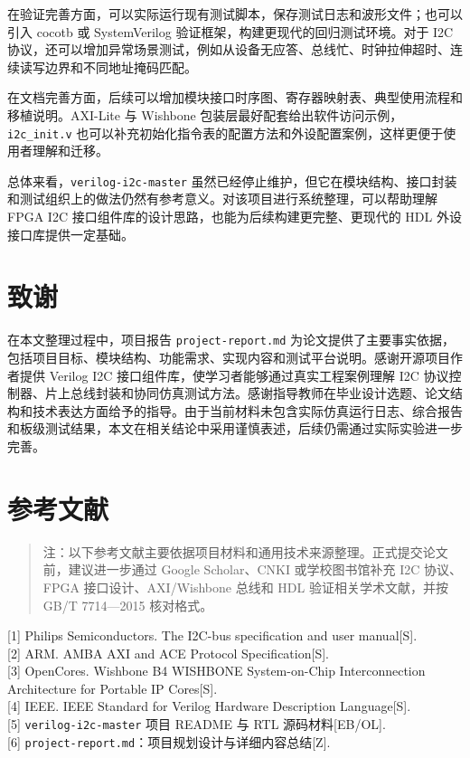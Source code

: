 在验证完善方面，可以实际运行现有测试脚本，保存测试日志和波形文件；也可以引入 cocotb 或 SystemVerilog 验证框架，构建更现代的回归测试环境。对于 I2C 协议，还可以增加异常场景测试，例如从设备无应答、总线忙、时钟拉伸超时、连续读写边界和不同地址掩码匹配。

在文档完善方面，后续可以增加模块接口时序图、寄存器映射表、典型使用流程和移植说明。AXI-Lite 与 Wishbone 包装层最好配套给出软件访问示例，\texttt{i2c\_init.v} 也可以补充初始化指令表的配置方法和外设配置案例，这样更便于使用者理解和迁移。

总体来看，\texttt{verilog-i2c-master} 虽然已经停止维护，但它在模块结构、接口封装和测试组织上的做法仍然有参考意义。对该项目进行系统整理，可以帮助理解 FPGA I2C 接口组件库的设计思路，也能为后续构建更完整、更现代的 HDL 外设接口库提供一定基础。

\section{致谢}\label{ux81f4ux8c22}

在本文整理过程中，项目报告 \texttt{project-report.md} 为论文提供了主要事实依据，包括项目目标、模块结构、功能需求、实现内容和测试平台说明。感谢开源项目作者提供 Verilog I2C 接口组件库，使学习者能够通过真实工程案例理解 I2C 协议控制器、片上总线封装和协同仿真测试方法。感谢指导教师在毕业设计选题、论文结构和技术表达方面给予的指导。由于当前材料未包含实际仿真运行日志、综合报告和板级测试结果，本文在相关结论中采用谨慎表述，后续仍需通过实际实验进一步完善。

\section{参考文献}\label{ux53c2ux8003ux6587ux732e}

\begin{quote}
注：以下参考文献主要依据项目材料和通用技术来源整理。正式提交论文前，建议进一步通过 Google Scholar、CNKI 或学校图书馆补充 I2C 协议、FPGA 接口设计、AXI/Wishbone 总线和 HDL 验证相关学术文献，并按 GB/T 7714---2015 核对格式。
\end{quote}

{[}1{]} Philips Semiconductors. The I2C-bus specification and user manual{[}S{]}.\\
{[}2{]} ARM. AMBA AXI and ACE Protocol Specification{[}S{]}.\\
{[}3{]} OpenCores. Wishbone B4 WISHBONE System-on-Chip Interconnection Architecture for Portable IP Cores{[}S{]}.\\
{[}4{]} IEEE. IEEE Standard for Verilog Hardware Description Language{[}S{]}.\\
{[}5{]} \texttt{verilog-i2c-master} 项目 README 与 RTL 源码材料{[}EB/OL{]}.\\
{[}6{]} \texttt{project-report.md}：项目规划设计与详细内容总结{[}Z{]}.

